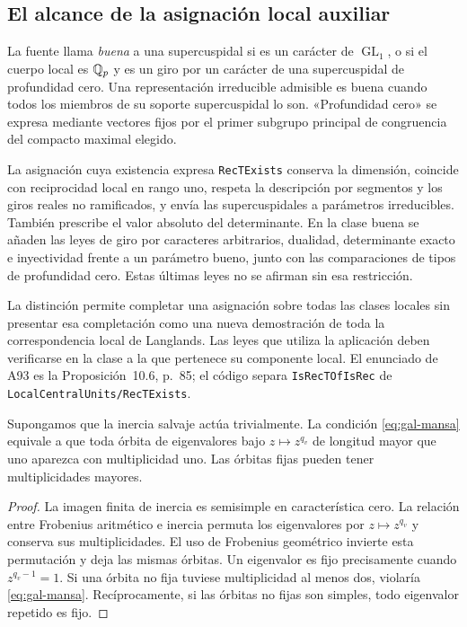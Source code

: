 \subsection{El alcance de la asignación local auxiliar}
\label{subsec:gal-rect}

La fuente llama \emph{buena} a una supercuspidal si es un carácter
de $\operatorname{GL}_1$, o si el cuerpo local es $\mathbb{Q}_p$ y
es un giro por un carácter de una supercuspidal de profundidad cero.
Una representación irreducible admisible es buena cuando todos
los miembros de su soporte supercuspidal lo son.
«Profundidad cero» se expresa mediante vectores fijos por el primer
subgrupo principal de congruencia del compacto maximal elegido.

La asignación cuya existencia expresa \texttt{RecTExists}
conserva la dimensión, coincide
con reciprocidad local en rango uno, respeta la descripción por
segmentos y los giros reales no ramificados, y envía las
supercuspidales a parámetros irreducibles. También prescribe
el valor absoluto del determinante. En la clase buena se añaden
las leyes de giro por caracteres arbitrarios, dualidad,
determinante exacto e inyectividad frente a un parámetro bueno,
junto con las comparaciones de tipos de profundidad cero.
Estas últimas leyes no se afirman sin esa restricción.

La distinción permite completar una asignación sobre todas las
clases locales sin presentar esa completación como una nueva
demostración de toda la correspondencia local de Langlands.
Las leyes que utiliza la aplicación deben verificarse en la
clase a la que pertenece su componente local.
El enunciado de A93 es la Proposición~10.6, p.~85;
el código separa \texttt{IsRecTOfIsRec} de
\texttt{LocalCentralUnits/RecTExists}.

\begin{lema}
\label{lem:gal-orbitas}
Supongamos que la inercia salvaje actúa trivialmente.
La condición \eqref{eq:gal-mansa} equivale a que toda órbita
de eigenvalores bajo $z\mapsto z^{q_v}$ de longitud mayor que uno
aparezca con multiplicidad uno.
Las órbitas fijas pueden tener multiplicidades mayores.
\end{lema}

\begin{proof}
La imagen finita de inercia es semisimple en característica cero.
La relación entre Frobenius aritmético e inercia permuta los
eigenvalores por $z\mapsto z^{q_v}$ y conserva sus multiplicidades.
El uso de Frobenius geométrico invierte esta permutación y deja
las mismas órbitas. Un eigenvalor es fijo precisamente cuando
$z^{q_v-1}=1$. Si una órbita no fija tuviese multiplicidad al menos
dos, violaría \eqref{eq:gal-mansa}. Recíprocamente, si las órbitas
no fijas son simples, todo eigenvalor repetido es fijo.
\end{proof}

